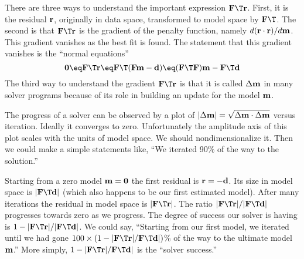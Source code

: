 There are three ways to understand the important expression $\bold F\T\bold r$.
First, it is the residual $\bold r$, 
originally in data space, transformed to model space by $\bold F\T$.
The second is that $\bold F\T \bold r$
is the gradient of the penalty function,
namely $d(\bold r \cdot \bold r)/d\bold m$.
This gradient vanishes as the best fit is found.
The statement that this gradient vanishes is the ``normal equations''
\begin{equation}
 \bold 0 \eq
 \bold F\T \bold r 
 \eq  \bold F\T(\bold F\bold m-\bold d) 
 \eq (\bold F\T\bold F) \bold m - \bold F\T\bold d
\end{equation}
The third way to understand the gradient $\bold F\T \bold r$
is that it is called $\Delta \bold m$ in many solver programs
because of its role in building an update for the model $\bold m$.

\par
The progress of a solver can be observed by a plot of 
$|\Delta\bold m| = \sqrt{\Delta\bold m \cdot \Delta\bold m }$ versus iteration.
Ideally it converges to zero.
Unfortunately the amplitude axis of this plot
scales with the units of model space.
We should nondimensionalize it.
Then we could make a simple statements like,
``We iterated 90\% of the way to the solution.''

\par
Starting from a zero model $\bold m=\bold 0$
the first residual is $\bold r = -\bold d$.
Its size in model space is $|\bold F\T\bold d|$
(which also happens to be our first estimated model).
After many iterations the residual in model space is
$|\bold F\T\bold r|$.
The ratio
$|\bold F\T\bold r|/|\bold F\T\bold d|$
progresses towards zero as we progress.
The degree of success our solver is having is
$1-|\bold F\T\bold r|/|\bold F\T\bold d|$.
We could say,
``Starting from our first model, we iterated
until we had gone
$100\times (1- |\bold F\T\bold r|/\bold F\T\bold d|)$\%
of the way to the ultimate model $\bold m$.''
More simply,
$1- |\bold F\T\bold r|/\bold F\T\bold d|$ is the ``solver success.''



\par
{}
\par

